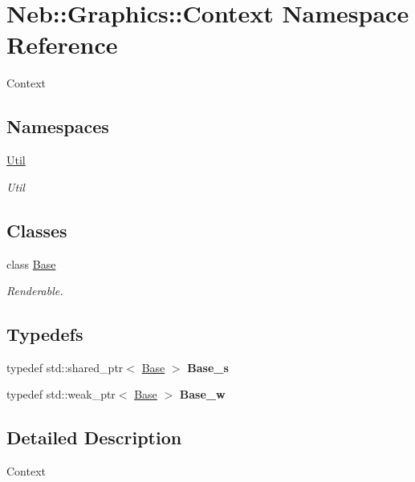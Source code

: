 \hypertarget{namespaceNeb_1_1Graphics_1_1Context}{\section{Neb\-:\-:Graphics\-:\-:Context Namespace Reference}
\label{namespaceNeb_1_1Graphics_1_1Context}
}


Context  


\subsection*{Namespaces}
\begin{DoxyCompactItemize}
\item 
\hyperlink{namespaceNeb_1_1Graphics_1_1Context_1_1Util}{Util}
\begin{DoxyCompactList}\small\item\em Util \end{DoxyCompactList}\end{DoxyCompactItemize}
\subsection*{Classes}
\begin{DoxyCompactItemize}
\item 
class \hyperlink{classNeb_1_1Graphics_1_1Context_1_1Base}{Base}
\begin{DoxyCompactList}\small\item\em Renderable. \end{DoxyCompactList}\end{DoxyCompactItemize}
\subsection*{Typedefs}
\begin{DoxyCompactItemize}
\item 
\hypertarget{namespaceNeb_1_1Graphics_1_1Context_a33efd07ab180cb088c84c34175e40259}{typedef std\-::shared\-\_\-ptr$<$ \hyperlink{classNeb_1_1Graphics_1_1Context_1_1Base}{Base} $>$ {\bfseries Base\-\_\-s}}\label{namespaceNeb_1_1Graphics_1_1Context_a33efd07ab180cb088c84c34175e40259}

\item 
\hypertarget{namespaceNeb_1_1Graphics_1_1Context_af64895a522d4890d8d17a12f91c7742e}{typedef std\-::weak\-\_\-ptr$<$ \hyperlink{classNeb_1_1Graphics_1_1Context_1_1Base}{Base} $>$ {\bfseries Base\-\_\-w}}\label{namespaceNeb_1_1Graphics_1_1Context_af64895a522d4890d8d17a12f91c7742e}

\end{DoxyCompactItemize}


\subsection{Detailed Description}
Context 
